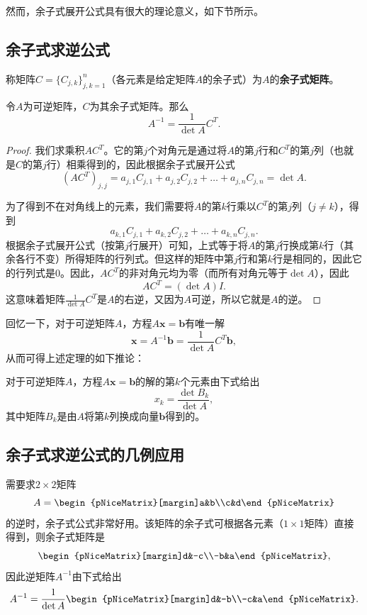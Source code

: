 然而，余子式展开公式具有很大的理论意义，如下节所示。

\subsection{余子式求逆公式}

称矩阵$C=\{C_{j,k}\}_{j,k=1}^{n}$（各元素是给定矩阵$A$的余子式）为$A$的\textbf{余子式矩阵}。

\begin{theorem}
  令$A$为可逆矩阵，$C$为其余子式矩阵。那么\[A^{-1}=\frac{1}{\det A}C^T.\]
\end{theorem}
\begin{proof}
  我们求乘积$AC^T$。它的第$j$个对角元是通过将$A$的第$j$行和$C^T$的第$j$列（也就是$C$的第$j$行）相乘得到的，因此根据余子式展开公式\[(AC^T)_{j,j}=a_{j,1}C_{j,1}+a_{j,2}C_{j,2}+\ldots+a_{j,n}C_{j,n}=\det A.\]

  为了得到不在对角线上的元素，我们需要将$A$的第$k$行乘以$C^T$的第$j$列（$j\ne k$），得到\[a_{k,1}C_{j,1}+a_{k,2}C_{j,2}+\ldots+a_{k,n}C_{j,n}.\]
  根据余子式展开公式（按第$j$行展开）可知，上式等于将$A$的第$j$行换成第$k$行（其余各行不变）所得矩阵的行列式。但这样的矩阵中第$j$行和第$k$行是相同的，因此它的行列式是$0$。因此，$AC^T$的非对角元均为零（而所有对角元等于$\det A$），因此\[AC^T=\left(\det A\right)I.\]
  这意味着矩阵$\frac{1}{\det A}C^T$是$A$的右逆，又因为$A$可逆，所以它就是$A$的逆。
\end{proof}

回忆一下，对于可逆矩阵$A$，方程$A\mathbf{x}=\mathbf{b}$有唯一解\[\mathbf{x}=A^{-1}\mathbf{b}=\frac{1}{\det A}C^T\mathbf{b},\]从而可得上述定理的如下推论：
\begin{corollary}[克拉默法则]
  对于可逆矩阵$A$，方程$A\mathbf{x}=\mathbf{b}$的解的第$k$个元素由下式给出\[x_k=\frac{\det B_k}{\det A},\]其中矩阵$B_k$是由$A$将第$k$列换成向量$\mathbf{b}$得到的。
\end{corollary}

\subsection{余子式求逆公式的几例应用}

\begin{example*}
  需要求$2\times 2$矩阵\[A=\begin{pNiceMatrix}[margin]a&b\\c&d\end{pNiceMatrix}\]的逆时，余子式公式非常好用。该矩阵的余子式可根据各元素（$1\times 1$矩阵）直接得到，则余子式矩阵是
  \[\begin{pNiceMatrix}[margin]d&-c\\-b&a\end{pNiceMatrix},\]
  因此逆矩阵$A^{-1}$由下式给出\[A^{-1}=\frac{1}{\det A}\begin{pNiceMatrix}[margin]d&-b\\-c&a\end{pNiceMatrix}.\]
\end{example*}

